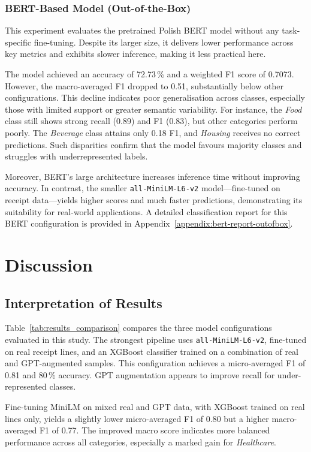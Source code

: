 \documentclass{SGGW-thesis-EN}
\begin{document}
\subsection{BERT-Based Model (Out-of-the-Box)}
This experiment evaluates the pretrained Polish BERT model without any task-specific fine-tuning. Despite its larger size, it delivers lower performance across key metrics and exhibits slower inference, making it
less practical here.

The model achieved an accuracy of 72.73\,\% and a weighted F1 score of 0.7073. However, the
macro-averaged F1 dropped to 0.51, substantially below other configurations. This decline indicates poor
generalisation across classes, especially those with limited support or greater semantic variability.
For instance, the \emph{Food} class still shows strong recall (0.89) and F1 (0.83), but other categories
perform poorly. The \emph{Beverage} class attains only 0.18 F1, and \emph{Housing} receives no correct
predictions. Such disparities confirm that the model favours majority classes and struggles with underrepresented labels.

Moreover, BERT’s large architecture increases inference time without improving accuracy. In contrast, the smaller
\texttt{all-MiniLM-L6-v2} model—fine-tuned on receipt data—yields higher scores and much faster predictions,
demonstrating its suitability for real-world applications.
A detailed classification report for this BERT configuration is provided in Appendix~\ref{appendix:bert-report-outofbox}.

\chapter{Discussion}

\section{Interpretation of Results}
Table~\ref{tab:results_comparison} compares the three model configurations evaluated in this study. The strongest
pipeline uses \texttt{all-MiniLM-L6-v2}, fine-tuned on real receipt lines, and an XGBoost classifier trained on a
combination of real and GPT-augmented samples. This configuration achieves a micro-averaged F1 of 0.81
and 80\,\% accuracy. GPT augmentation appears to improve recall for under-represented classes.

Fine-tuning MiniLM on mixed real and GPT data, with XGBoost trained on real lines only, yields a slightly lower
micro-averaged F1 of 0.80 but a higher macro-averaged F1 of 0.77. The improved macro
score indicates more balanced performance across all categories, especially a marked gain for \emph{Healthcare}.
\end{document}
